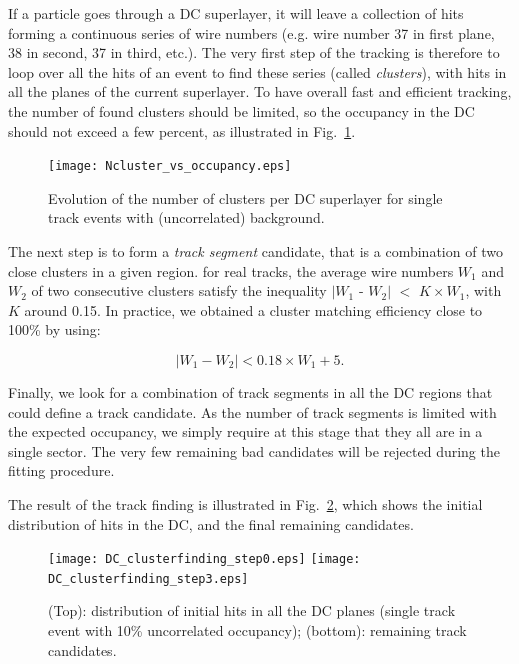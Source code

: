 If a particle goes through a DC superlayer, it will leave a collection of hits 
forming a continuous series of wire numbers (e.g. wire number 37 in first plane, 38 
in second, 37 in third, etc.).  The very first step of the tracking is therefore to 
loop over all the hits of an event to find these series (called \emph{clusters}), 
with hits in all the planes of the current superlayer.  To have overall fast and 
efficient tracking, the number of found clusters should be limited, so the occupancy 
in the DC should not exceed a few percent, as illustrated in 
Fig.~\ref{sec_forward:pic_Nclusters}.

\begin{figure}[ht!]
\centering
\texttt{[image: Ncluster\_vs\_occupancy.eps]}
\caption{\small{Evolution of the number of clusters per DC superlayer for single 
track events with (uncorrelated) background.}}
\label{sec_forward:pic_Nclusters}
\end{figure}

The next step is to form a \emph{track segment} candidate, that is a combination of 
two close clusters in a given region. for real tracks, the average wire numbers 
$W_1$ and $W_2$ of two consecutive clusters satisfy the inequality 
$|W_1$ - $W_2|$ $<$ $K\times$$W_1$, with $K$ around 0.15.  In practice, we obtained 
a cluster matching efficiency close to 100\% by using:

\begin{equation}
|W_1-W_2| < 0.18 \times W_1 + 5.
\end{equation}

Finally, we look for a combination of track segments in all the DC regions that could 
define a track candidate.  As the number of track segments is limited with the 
expected occupancy, we simply require at this stage that they all are in a single 
sector.  The very few remaining bad candidates will be rejected during the fitting 
procedure.

The result of the track finding is illustrated in 
Fig.~\ref{sec_forward:pic_trackfinding}, which shows the initial distribution of hits 
in the DC, and the final remaining candidates.

\begin{figure}[ht!]
\centering
\texttt{[image: DC\_clusterfinding\_step0.eps]}
\texttt{[image: DC\_clusterfinding\_step3.eps]}
\caption{\small{(Top): distribution of initial hits in all the DC planes (single track 
event with 10\% uncorrelated occupancy); (bottom): remaining track candidates.}}
\label{sec_forward:pic_trackfinding}
\end{figure}

